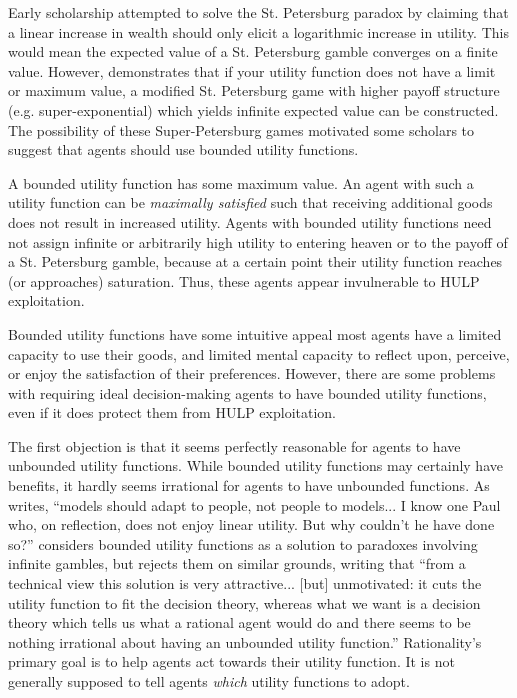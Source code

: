 \documentclass{article}
\begin{document}
Early scholarship attempted to solve the St. Petersburg paradox by claiming that a linear increase in wealth should only elicit a logarithmic increase in utility. This would mean the expected value of a St. Petersburg gamble converges on a finite value. However, \citet{menger1934petersburg} demonstrates that if your utility function does not have a limit or maximum value, a modified St. Petersburg game with higher payoff structure (e.g. super-exponential) which yields infinite expected value can be constructed. The possibility of these Super-Petersburg games motivated some scholars to suggest that agents should use bounded utility functions.

A bounded utility function has some maximum value. An agent with such a utility function can be \textit{maximally satisfied} such that receiving additional goods does not result in increased utility. Agents with bounded utility functions need not assign infinite or arbitrarily high utility to entering heaven or to the payoff of a St. Petersburg gamble, because at a certain point their utility function reaches (or approaches) saturation. Thus, these agents appear invulnerable to HULP exploitation. 

Bounded utility functions have some intuitive appeal \textemdash{} most agents have a limited capacity to use their goods, and limited mental capacity to reflect upon, perceive, or enjoy the satisfaction of their preferences. However, there are some problems with requiring ideal decision-making agents to have bounded utility functions, even if it does protect them from HULP exploitation.

The first objection is that it seems perfectly reasonable for agents to have unbounded utility functions. While bounded utility functions may certainly have benefits, it hardly seems irrational for agents to have unbounded functions. As \citet[pg. 26]{samuelson1977st} writes, ``models should adapt to people, not people to models... I know one Paul who, on reflection, does not enjoy linear utility. But why couldn't he have done so?'' \citet[pg. 496]{smith2014evaluative} considers bounded utility functions as a solution to paradoxes involving infinite gambles, but rejects them on similar grounds, writing that ``from a technical view this solution is very attractive... [but] unmotivated: it cuts the utility function to fit the decision theory, whereas what we want is a decision theory which tells us what a rational agent would do \textemdash{} and there seems to be nothing irrational about having an unbounded utility function.'' Rationality's primary goal is to help agents act towards their utility function. It is not generally supposed to tell agents \textit{which} utility functions to adopt.
\end{document}
